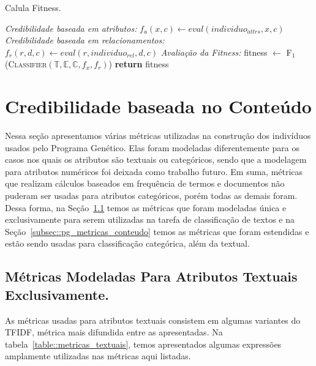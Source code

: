 \begin{algorithm}
\centering
\caption{Calula Fitness.}
\label{alg::fitness}
\begin{algorithmic}[1]
{
{}
  \State \textit{Credibilidade baseada em atributos:}
      \State $f_a(x,c) \gets eval(individuo_{attrs}, x, c)$
    \EndFor
  \EndFor
  \State \textit{Credibilidade baseada em relacionamentos:}
            \State $f_r(r,d,c) \gets eval(r,individuo_{rel}, d, c)$
        \EndFor
    \EndFor
  \EndFor
  \State \textit{Avaliação da Fitness:}
  \State fitness $\gets$ \textsc{F$_1$}(\textsc{Classifier}$(\mathbb{T}, \mathbb{E}, \mathbb{C}, f_x, f_r)$)
  \State \textbf{return} fitness
\EndFunction
}
\end{algorithmic}
\end{algorithm}

\section{Credibilidade baseada no Conteúdo}
\label{sec::pg_cred_baseada_conteudo}

Nessa seção apresentamos várias métricas utilizadas na construção dos indivíduos usados pelo Programa Genético. Elas foram modeladas diferentemente para os casos nos quais os atributos são textuais ou categóricos, sendo que a modelagem para atributos numéricos foi deixada como trabalho futuro. Em suma, métricas que realizam cálculos baseados em frequência de termos e documentos não puderam ser usadas para atributos categóricos, porém todas as demais foram. Dessa forma, na Seção~\ref{subsec::pg_metricas_conteudo_textual} temos as métricas que foram modeladas única e exclusivamente para serem utilizadas na tarefa de classificação de textos e na Seção~\ref{subsec::pg_metricas_conteudo} temos as métricas que foram estendidas e estão sendo usadas para classificação categórica, além da textual.

\subsection{Métricas Modeladas Para Atributos Textuais Exclusivamente.}
\label{subsec::pg_metricas_conteudo_textual}

As métricas usadas para atributos textuais consistem em algumas variantes do \textsc{TFIDF}, métrica mais difundida entre as apresentadas. Na tabela~\ref{table::metricas_textuais}, temos apresentados algumas expressões amplamente utilizadas nas métricas aqui listadas.

